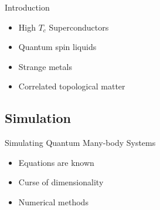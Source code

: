 \begin{frame}{Introduction}
\begin{itemize}
{\begin{itemize}
                      \item High $T_c$ Superconductors
                      \item Quantum  spin  liquids
                      \item Strange metals
                      \item Correlated topological matter
                  \end{itemize}
              }
    \end{itemize}

\end{frame}

\subsection{Simulation}

\begin{frame}{Simulating Quantum Many-body Systems}
    \begin{itemize}
        \item Equations are known
        \item Curse of dimensionality
        \item Numerical methods
    \end{itemize}
\end{frame}

